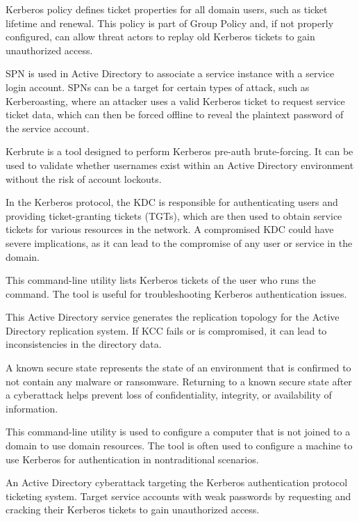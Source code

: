  Kerberos policy defines ticket properties for all domain users, such as ticket lifetime and renewal. This policy is part of Group Policy and, if not properly configured, can allow threat actors to replay old Kerberos tickets to gain unauthorized access.

 SPN is used in Active Directory to associate a service instance with a service login account. SPNs can be a target for certain types of attack, such as Kerberoasting, where an attacker uses a valid Kerberos ticket to request service ticket data, which can then be forced offline to reveal the plaintext password of the service account.

 Kerbrute is a tool designed to perform Kerberos pre-auth brute-forcing. It can be used to validate whether usernames exist within an Active Directory environment without the risk of account lockouts.

 In the Kerberos protocol, the KDC is responsible for authenticating users and providing ticket-granting tickets (TGTs), which are then used to obtain service tickets for various resources in the network. A compromised KDC could have severe implications, as it can lead to the compromise of any user or service in the domain.

 This command-line utility lists Kerberos tickets of the user who runs the command. The tool is useful for troubleshooting Kerberos authentication issues.

 This Active Directory service generates the replication topology for the Active Directory replication system. If KCC fails or is compromised, it can lead to inconsistencies in the directory data.

 A known secure state represents the state of an environment that is confirmed to not contain any malware or ransomware. Returning to a known secure state after a cyberattack helps prevent loss of confidentiality, integrity, or availability of information.

 This command-line utility is used to configure a computer that is not joined to a domain to use domain resources. The tool is often used to configure a machine to use Kerberos for authentication in nontraditional scenarios.

 An Active Directory cyberattack targeting the Kerberos authentication protocol ticketing system. Target service accounts with weak passwords by requesting and cracking their Kerberos tickets to gain unauthorized access.

